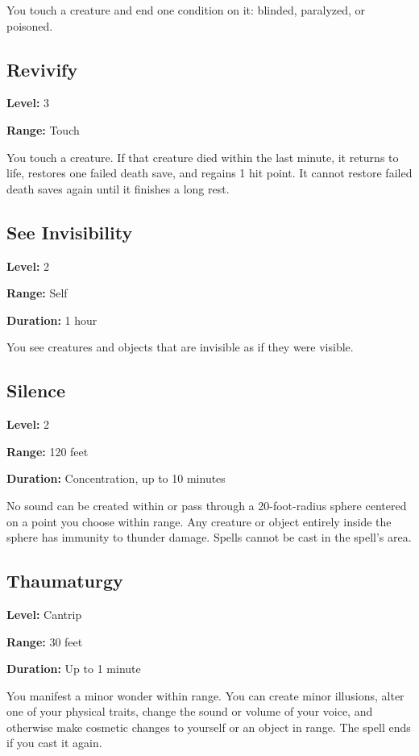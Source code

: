 \documentclass[12pt,letterpaper,twocolumn,openany,nodeprecatedcode,bg=none]{dndbook}
\let\oldsubsection\subsection
\renewcommand{\subsection}[1]{%
  \needspace{5\baselineskip}%
  \oldsubsection{#1}%
}
\begin{document}
You touch a creature and end one condition on it: blinded, paralyzed, or
poisoned.

\subsection{Revivify}\label{revivify}

\textbf{Level:} 3

\textbf{Range:} Touch

You touch a creature. If that creature died within the last minute, it
returns to life, restores one failed death save, and regains 1 hit
point. It cannot restore failed death saves again until it finishes a
long rest.

\subsection{See Invisibility}\label{see-invisibility}

\textbf{Level:} 2

\textbf{Range:} Self

\textbf{Duration:} 1 hour

You see creatures and objects that are invisible as if they were
visible.

\subsection{Silence}\label{silence}

\textbf{Level:} 2

\textbf{Range:} 120 feet

\textbf{Duration:} Concentration, up to 10 minutes

No sound can be created within or pass through a 20-foot-radius sphere
centered on a point you choose within range. Any creature or object
entirely inside the sphere has immunity to thunder damage. Spells cannot
be cast in the spell's area.

\subsection{Thaumaturgy}\label{thaumaturgy}

\textbf{Level:} Cantrip

\textbf{Range:} 30 feet

\textbf{Duration:} Up to 1 minute

You manifest a minor wonder within range. You can create minor
illusions, alter one of your physical traits, change the sound or volume
of your voice, and otherwise make cosmetic changes to yourself or an
object in range. The spell ends if you cast it again.
\end{document}
